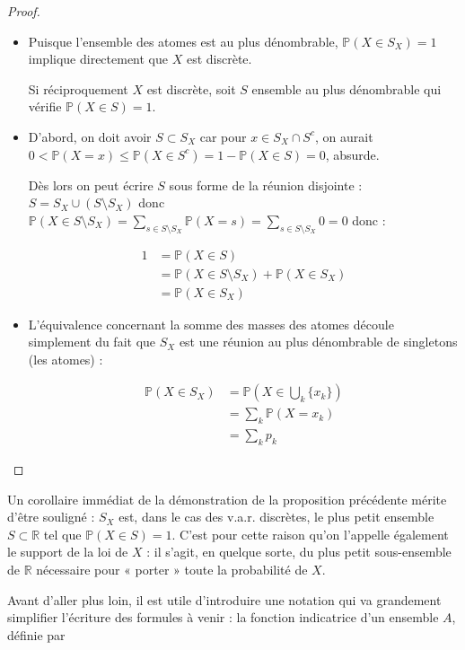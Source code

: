 \begin{proof}
\begin{itemize}
\item Puisque l'ensemble des atomes est au plus dénombrable, $\mathbb{P}(X \in S_X) = 1$ implique directement que $X$ est discrète. 

Si réciproquement $X$ est discrète, soit $S$ ensemble au plus dénombrable qui vérifie $\mathbb{P}(X \in S) = 1$. 
\item D'abord, on doit avoir $S \subset S_X$ car pour $x \in S_X \cap S^c$, on aurait $0 < \mathbb{P}(X = x) \leq \mathbb{P}(X \in S^c) = 1 - \mathbb{P}(X \in S) = 0$, absurde. 

Dès lors on peut écrire $S$ sous forme de la réunion disjointe : $S = S_X \cup (S \setminus S_X)$ donc $\mathbb{P}(X \in S \setminus S_X) = \sum_{s \in S \setminus S_X} \mathbb{P}(X = s) = \sum_{s \in S \setminus S_X} 0 = 0$ donc :

\begin{align*}
1 &= \mathbb{P}(X \in S) \\ 
&= \mathbb{P}(X \in S \setminus S_X) + \mathbb{P}(X \in S_X) \\ 
&= \mathbb{P}(X \in S_X)
\end{align*}
\item L'équivalence concernant la somme des masses des atomes découle simplement du fait que $S_X$ est une réunion au plus dénombrable de singletons (les atomes) :

\begin{align*}
\mathbb{P}(X \in S_X) &= \mathbb{P}\left(X \in \bigcup_k \{x_k\}\right) \\
&= \sum_k \mathbb{P}(X = x_k) \\
&= \sum_k p_k
\end{align*}
\end{itemize}
\end{proof}
Un corollaire immédiat de la démonstration de la proposition précédente mérite d'être souligné : $S_X$ est, dans le cas des v.a.r. discrètes, le plus petit ensemble $S \subset \mathbb{R}$ tel que $\mathbb{P}(X \in S) = 1$. C'est pour cette raison qu'on l'appelle également le support de la loi de $X$ : il s'agit, en quelque sorte, du plus petit sous-ensemble de $\mathbb{R}$ nécessaire pour « porter » toute la probabilité de $X$.

Avant d'aller plus loin, il est utile d'introduire une notation qui va grandement simplifier l'écriture des formules à venir : la fonction indicatrice d'un ensemble $A$, définie par


